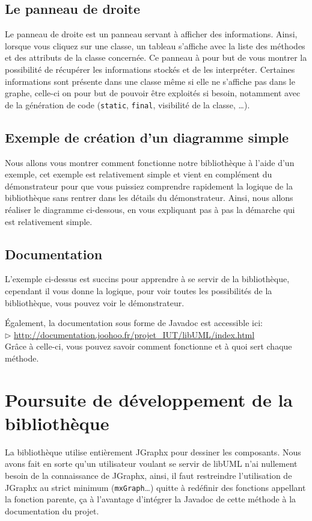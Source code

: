 \documentclass[12pt,a4paper,openany]{book}
\begin{document}
	\section{Le panneau de droite}
		Le panneau de droite est un panneau servant à afficher des informations. Ainsi, lorsque vous cliquez sur une classe, un tableau s'affiche
		avec la liste des méthodes et des attributs de la classe concernée. Ce panneau à pour but de vous montrer la possibilité
		de récupérer les informations stockés et de les interpréter. Certaines informations sont présente dans une classe même
		si elle ne s'affiche pas dans le graphe, celle-ci on pour but de pouvoir être exploités si besoin, notamment avec de la génération
		de code (\texttt{static}, \texttt{final}, visibilité de la classe, \ldots).
	\section{Exemple de création d'un diagramme simple}
		Nous allons vous montrer comment fonctionne notre bibliothèque à l'aide d'un exemple, cet exemple est relativement simple
		et vient en complément du démonstrateur pour que vous puissiez comprendre rapidement la logique de la bibliothèque sans rentrer dans les détails
		du démonstrateur. Ainsi, nous allons réaliser le diagramme ci-dessous, en vous expliquant pas à pas la démarche qui est relativement simple.
		
	\section{Documentation}
		L'exemple ci-dessus est succins pour apprendre à se servir de la bibliothèque, cependant il vous donne la logique, pour voir toutes les possibilités
		de la bibliothèque, vous pouvez voir le démonstrateur. 

		Également, la documentation sous forme de Javadoc est accessible ici:\\
	$\rhd$ \url{http://documentation.joohoo.fr/projet\_IUT/libUML/index.html}\\
	Grâce à celle-ci, vous pouvez savoir comment fonctionne et à quoi sert chaque méthode.

	\chapter{Poursuite de développement de la bibliothèque}				
	La bibliothèque utilise entièrement JGraphx pour dessiner les composants. Nous avons fait en sorte qu'un utilisateur voulant se servir de libUML
	n'ai nullement besoin de la connaissance de JGraphx, ainsi, il faut restreindre l'utilisation de JGraphx au strict minimum (\texttt{mxGraph}\ldots) quitte
	à redéfinir des fonctions appellant la fonction parente, ça à l'avantage d'intégrer la Javadoc de cette méthode à la documentation du projet.
\end{document}
